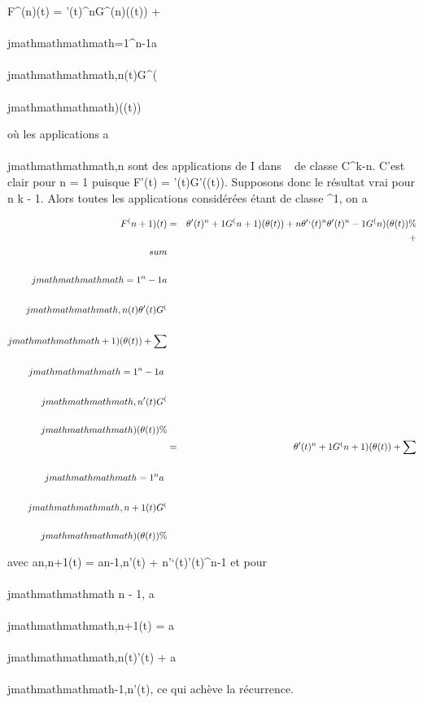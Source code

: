 F^(n)(t) = \theta'(t)^nG^(n)(\theta(t)) +
\sum \\\\jmathmathmathmath=1^n-1a~
\\\\jmathmathmathmath,n(t)G^(\\\\jmathmathmathmath)(\theta(t))

où les applications a\\\\jmathmathmathmath,n sont des applications de I dans ~ de
classe C^k-n. C'est clair pour n = 1 puisque F'(t) =
\theta'(t)G'(\theta(t)). Supposons donc le résultat vrai pour n \leq k - 1. Alors
toutes les applications considérées étant de classe ^1, on a

\begin{align*} F^(n+1)(t)& =&
\theta'(t)^n+1G^(n+1)(\theta(t)) +
n\theta'`(t)^n\theta'(t)^n-1G^(n)(\theta(t)) \%&
\\ & & +\\sum
\\\\jmathmathmathmath=1^n-1a \\\\jmathmathmathmath,n(t)\theta'(t)G^(\\\\jmathmathmathmath+1)(\theta(t))
+ \sum \\\\jmathmathmathmath=1^n-1a~
\\\\jmathmathmathmath,n'(t)G^(\\\\jmathmathmathmath)(\theta(t))\%& \\ &
=& \theta'(t)^n+1G^(n+1)(\theta(t)) +
\sum \\\\jmathmathmathmath=1^na~
\\\\jmathmathmathmath,n+1(t)G^(\\\\jmathmathmathmath)(\theta(t)) \%& \\
\end{align*}

avec an,n+1(t) = an-1,n\theta'(t) +
n\theta'`(t)\theta'(t)^n-1 et pour \\\\jmathmathmathmath \leq n - 1, a\\\\jmathmathmathmath,n+1(t) =
a\\\\jmathmathmathmath,n(t)\theta'(t) + a\\\\jmathmathmathmath-1,n'(t), ce qui achève la
récurrence.

